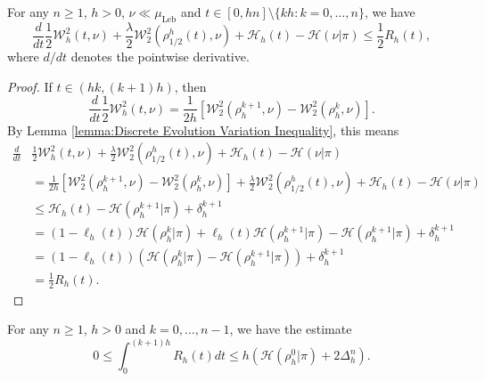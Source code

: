 \documentclass[final,12pt]{colt2018}
\newcommand{\was}{\mathcal{W}}
\begin{document}
\begin{lemma}\label{lemma:Gradient flow approximation}
For any $n\geq 1$, $h >0$, $\nu \ll \mu_{\text{Leb}}$ and $t\in [0,hn]\setminus \{kh : k = 0,\dots,n\}$, we have
\begin{equation}
\frac{d}{dt}\frac{1}{2}\was_{h}^2(t,\nu) +\frac{\lambda}{2}\was_2^2(\rho^h_{1/2}(t),\nu)  + \mathcal{H}_{h}(t) - \mathcal{H}(\nu | \pi) \leq \frac{1}{2}R_{h}(t),
\end{equation}
where $d/dt$ denotes the pointwise derivative.
\end{lemma}

\begin{proof}
If $t \in  (hk, (k+1)h)$, then
\begin{equation}
\frac{d}{dt}\frac{1}{2}\was^2_{h}(t, \nu) = \frac{1}{2h}\left[ \was_2^2(\rho_{h}^{k+1},\nu) - \was_2^2(\rho_{h}^{k},\nu) \right].
\end{equation}
By Lemma \ref{lemma:Discrete Evolution Variation Inequality}, this means
\begin{align}
\frac{d}{dt}&\frac{1}{2}\was^2_{h}(t, \nu) +\frac{\lambda}{2}\was_2^2(\rho^h_{1/2}(t),\nu)  + \mathcal{H}_{h}(t) - \mathcal{H}(\nu | \pi) \\
& = \frac{1}{2h}\left[ \was_2^2(\rho_{h}^{k+1},\nu) - \was_2^2(\rho_{h}^{k},\nu) \right] +\frac{\lambda}{2}\was_2^2(\rho^h_{1/2}(t),\nu) +  \mathcal{H}_{h}(t) - \mathcal{H}(\nu | \pi) \\
&\leq \mathcal{H}_{h}(t) - \mathcal{H}(\rho_{h}^{k+1} | \pi) + \delta_{h}^{k+1} \\
& = (1- \ell_{h}(t))\mathcal{H}(\rho_{h}^k | \pi) + \ell_{h}(t)\mathcal{H}(\rho_{h}^{k+1} | \pi) - \mathcal{H}(\rho_{h}^{k+1} | \pi) + \delta_{h}^{k+1} \\
& = (1- \ell_{h}(t))\left(\mathcal{H}(\rho_{h}^k | \pi) -\mathcal{H}(\rho_{h}^{k+1} | \pi) \right)+ \delta_{h}^{k+1} \\
& =\frac{1}{2} R_{h}(t).
\end{align}
\end{proof}

\begin{lemma}\label{lemma:bound_integral}
For any $n\geq 1$, $h >0$ and $k = 0, \dots, n-1$, we have the estimate
\begin{equation}
0\leq \int_0^{(k+1)h}R_{h}(t) dt \leq h\left(\mathcal{H}(\rho_{h}^{0} | \pi) + 2\Delta_{h}^{n}\right).
\end{equation}
\end{lemma}
\end{document}
